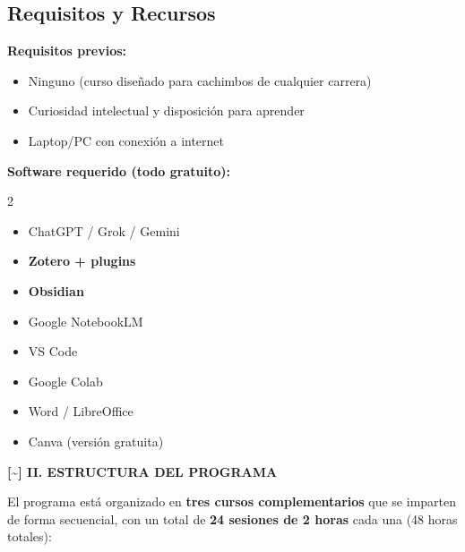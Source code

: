 \documentclass[12pt,a4paper]{yaac-luatex}
\newcommand{\faStream}{[\textasciitilde]}
\newcommand{\secciontitulo}[1]{
	\vspace{0.5cm}
	\begin{tcolorbox}[
		enhanced,
		colback=maincolor,
		colframe=maincolor,
		arc=3pt,
		boxrule=0pt,
		left=8pt,
		right=8pt,
		top=6pt,
		bottom=6pt
		]
		{\color{white}\large\bfseries #1}
	\end{tcolorbox}
}
\begin{document}
	\subsection*{Requisitos y Recursos}
	
	\textbf{Requisitos previos:}
	\begin{itemize}[leftmargin=*, itemsep=0.1cm]
		\item Ninguno (curso diseñado para cachimbos de cualquier carrera)
		\item Curiosidad intelectual y disposición para aprender
		\item Laptop/PC con conexión a internet
	\end{itemize}
	
	\textbf{Software requerido (todo gratuito):}
	\begin{multicols}{2}
		\begin{itemize}[leftmargin=*, itemsep=0.1cm]
			\item ChatGPT / Grok / Gemini
			\item \textbf{Zotero + plugins}
			\item \textbf{Obsidian}
			\item Google NotebookLM
			\item VS Code
			\item Google Colab
			\item Word / LibreOffice
			\item Canva (versión gratuita)
		\end{itemize}
	\end{multicols}
	
	\newpage
	
	\secciontitulo{\faStream \hspace{0.3em} II. ESTRUCTURA DEL PROGRAMA}
	
	El programa está organizado en \textbf{tres cursos complementarios} que se imparten de forma secuencial, con un total de \textbf{24 sesiones de 2 horas} cada una (48 horas totales):
	
	\vspace{0.5cm}
	
\end{document}
